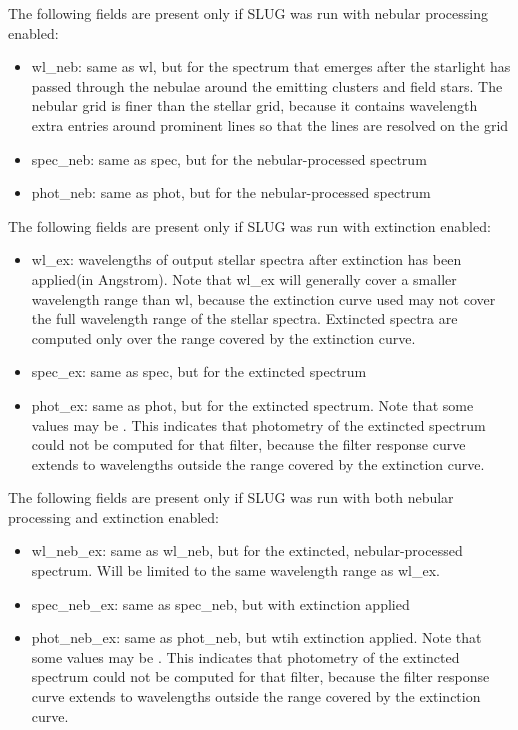 \documentclass[letterpaper,10pt,english]{sphinxmanual}
\begin{document}
The following fields are present only if SLUG was run with nebular processing enabled:
\begin{itemize}
\item {} 
wl\_neb: same as wl, but for the spectrum that emerges after the starlight has passed through the nebulae around the emitting clusters and field stars. The nebular grid is finer than the stellar grid, because it contains wavelength extra entries around prominent lines so that the lines are resolved on the grid

\item {} 
spec\_neb: same as spec, but for the nebular-processed spectrum

\item {} 
phot\_neb: same as phot, but for the nebular-processed spectrum

\end{itemize}

The following fields are present only if SLUG was run with extinction enabled:
\begin{itemize}
\item {} 
wl\_ex: wavelengths of output stellar spectra after extinction has been applied(in Angstrom). Note that wl\_ex will generally cover a smaller wavelength range than wl, because the extinction curve used may not cover the full wavelength range of the stellar spectra. Extincted spectra are computed only over the range covered by the extinction curve.

\item {} 
spec\_ex: same as spec, but for the extincted spectrum

\item {} 
phot\_ex: same as phot, but for the extincted spectrum. Note that some values may be . This indicates that photometry of the extincted spectrum could not be computed for that filter, because the filter response curve extends to wavelengths outside the range covered by the extinction curve.

\end{itemize}

The following fields are present only if SLUG was run with both nebular processing and extinction enabled:
\begin{itemize}
\item {} 
wl\_neb\_ex: same as wl\_neb, but for the extincted, nebular-processed spectrum. Will be limited to the same wavelength range as wl\_ex.

\item {} 
spec\_neb\_ex: same as spec\_neb, but with extinction applied

\item {} 
phot\_neb\_ex: same as phot\_neb, but wtih extinction applied. Note that some values may be . This indicates that photometry of the extincted spectrum could not be computed for that filter, because the filter response curve extends to wavelengths outside the range covered by the extinction curve.

\end{itemize}
\end{document}
